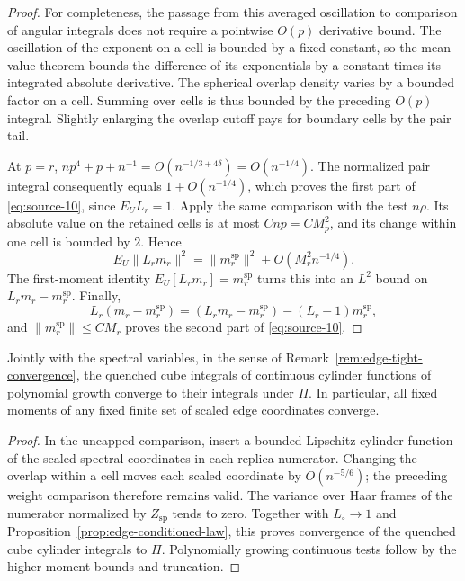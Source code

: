 \begin{proof}
For completeness, the passage from this averaged oscillation to comparison
of angular integrals does not require a pointwise $O(p)$ derivative bound.
The oscillation of the exponent on a cell is bounded by a fixed constant,
so the mean value theorem bounds the difference of its exponentials by a
constant times its integrated absolute derivative. The spherical overlap
density varies by a bounded factor on a cell. Summing over cells is thus
bounded by the preceding $O(p)$ integral. Slightly enlarging the overlap
cutoff pays for boundary cells by the pair tail.

At $p=r$, $np^4+p+n^{-1}=O(n^{-1/3+4\delta})=O(n^{-1/4})$.
The normalized pair integral consequently equals $1+O(n^{-1/4})$,
which proves the first part of \eqref{eq:source-10}, since $E_U L_r=1$.
Apply the same comparison with the test $n\rho$. Its absolute value on
the retained cells is at most $Cnp=CM_p^2$, and its change within one cell
is bounded by $2$. Hence
\[
 E_U\|L_rm_r\|^2
 =\|m_r^{\mathrm{sp}}\|^2+O(M_r^2n^{-1/4}).
\]
The first-moment identity $E_U[L_rm_r]=m_r^{\mathrm{sp}}$ turns this into
an $L^2$ bound on $L_rm_r-m_r^{\mathrm{sp}}$. Finally,
\[
 L_r(m_r-m_r^{\mathrm{sp}})
 =(L_rm_r-m_r^{\mathrm{sp}})-(L_r-1)m_r^{\mathrm{sp}},
\]
and $\|m_r^{\mathrm{sp}}\|\le CM_r$ proves the second part of
\eqref{eq:source-10}.
\end{proof}

\begin{corollary}\label{cor:observations-static}
Jointly with the spectral variables, in the sense of
Remark~\ref{rem:edge-tight-convergence}, the quenched cube integrals of
continuous cylinder functions of polynomial growth converge to their
integrals under $\Pi$. In particular, all fixed moments of any fixed finite
set of scaled edge coordinates converge.
\end{corollary}

\begin{proof}
In the uncapped comparison, insert a bounded Lipschitz cylinder function
of the scaled spectral coordinates in each replica numerator. Changing the
overlap within a cell moves each scaled coordinate by $O(n^{-5/6})$; the
preceding weight comparison therefore remains valid. The variance over Haar
frames of the numerator normalized by $Z_{\mathrm{sp}}$ tends to zero.
Together with $L_\circ\to1$ and
Proposition~\ref{prop:edge-conditioned-law}, this proves convergence of the
quenched cube cylinder integrals to $\Pi$. Polynomially growing continuous
tests follow by the higher moment bounds and truncation.
\end{proof}

